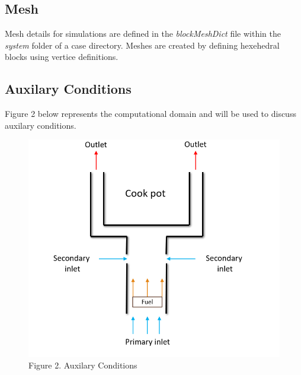 \documentclass[3p,times,twocolumn]{elsarticle}
\begin{document}
\subsection{Mesh}
Mesh details for simulations are defined in the \textit{blockMeshDict} file within the \textit{system} folder of a case directory. Meshes are created by defining hexehedral blocks using vertice definitions.

\subsection{Auxilary Conditions}
Figure 2 below represents the computational domain and will be used to discuss auxilary conditions.

\begin{figure}{\linewidth}
	\includegraphics[width=\linewidth]{auxconditions}
	\centering
	\caption{Figure 2. Auxilary Conditions}
	\newline
\end{figure}
\end{document}
